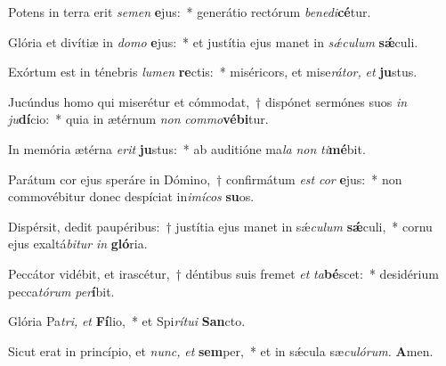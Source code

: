 \item Potens in terra erit \textit{semen} \textbf{e}jus:~* generátio rectórum \textit{benedi}\textbf{cé}tur.
\item Glória et divítiæ in \textit{domo} \textbf{e}jus:~* et justítia ejus manet in \textit{sǽculum} \textbf{sǽ}culi.
\item Exórtum est in ténebris \textit{lumen} \textbf{re}ctis:~* miséricors, et mise\textit{rátor,} \textit{et} \textbf{ju}stus.
\item Jucúndus homo qui miserétur et cómmodat,~† dispónet sermónes suos \textit{in} \textit{ju}\textbf{dí}cio:~* quia in ætérnum \textit{non} \textit{commo}\textbf{vébi}tur.
\item In memória ætérna \textit{erit} \textbf{ju}stus:~* ab auditióne ma\hspace*{0.03em}\textit{la} \textit{non} \textit{ti}\textbf{mé}bit.
\item Parátum cor ejus speráre in Dómino,~† confirmátum \textit{est} \textit{cor} \textbf{e}jus:~* non commovébitur donec despíciat in\textit{imícos} \textbf{su}os.
\item Dispérsit, dedit paupéribus:~† justítia ejus manet in sǽ\hspace*{0.03em}\textit{culum} \textbf{sǽ}culi,~* cornu ejus exaltá\hspace*{0.03em}\textit{bitur} \textit{in} \textbf{gló}ria.
\item Peccátor vidébit, et irascétur,~† déntibus suis fremet \textit{et} \textit{ta}\textbf{bé}scet:~* desidérium pecca\hspace*{0.03em}\textit{tórum} \textit{per}\textbf{í}bit.
\item Glória Pa\hspace*{0.03em}\textit{tri,} \textit{et} \textbf{Fí}lio,~* et Spi\hspace*{0.03em}\textit{rítui} \textbf{San}cto.
\item Sicut erat in princípio, et \textit{nunc,} \textit{et} \textbf{sem}per,~* et in sǽcula sæ\hspace*{0.03em}\textit{culórum.} \textbf{A}men.